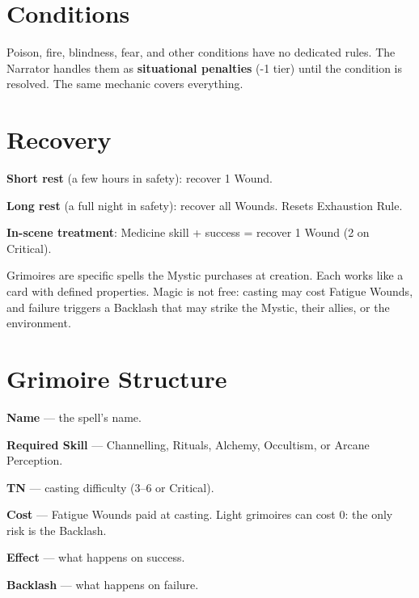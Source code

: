 \documentclass[10pt,a4paper]{article}
\begin{document}
\section*{Conditions}

Poison, fire, blindness, fear, and other conditions have no dedicated rules. The Narrator handles them as \textbf{situational penalties} (-1 tier) until the condition is resolved. The same mechanic covers everything.


\section*{Recovery}

\textbf{Short rest} (a few hours in safety): recover 1 Wound.


\textbf{Long rest} (a full night in safety): recover all Wounds. Resets Exhaustion Rule.


\textbf{In-scene treatment}: Medicine skill + success = recover 1 Wound (2 on Critical).




Grimoires are specific spells the Mystic purchases at creation. Each works like a card with defined properties. Magic is not free: casting may cost Fatigue Wounds, and failure triggers a Backlash that may strike the Mystic, their allies, or the environment.


\section*{Grimoire Structure}

\textbf{Name} — the spell's name.


\textbf{Required Skill} — Channelling, Rituals, Alchemy, Occultism, or Arcane Perception.


\textbf{TN} — casting difficulty (3–6 or Critical).


\textbf{Cost} — Fatigue Wounds paid at casting. Light grimoires can cost 0: the only risk is the Backlash.


\textbf{Effect} — what happens on success.


\textbf{Backlash} — what happens on failure.
\end{document}
